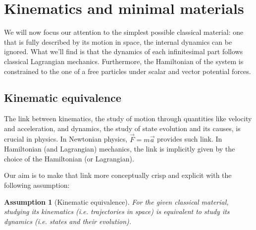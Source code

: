 \documentclass[aps,pra,10pt,twocolumn,floatfix,nofootinbib]{revtex4-1}
\numberwithin{equation}{section}
\newtheorem{assump}{Assumption}
\theoremstyle{definition}
\begin{document}
\section{Kinematics and minimal materials}

We will now focus our attention to the simplest possible classical material: one that is fully described by its motion in space, the internal dynamics can be ignored. What we'll find is that the dynamics of each infinitesimal part follows classical Lagrangian mechanics. Furthermore, the Hamiltonian of the system is constrained to the one of a free particles under scalar and vector potential forces.

\subsection{Kinematic equivalence}

The link between kinematics, the study of motion through quantities like velocity and acceleration, and dynamics, the study of state evolution and its causes, is crucial in physics. In Newtonian physics, $\vec{F}=m\vec{a}$ provides such link. In Hamiltonian (and Lagrangian) mechanics, the link is implicitly given by the choice of the Hamiltonian (or Lagrangian).

Our aim is to make that link more conceptually crisp and explicit with the following assumption:

\begin{assump}[Kinematic equivalence]\label{kinematic_equivalence}
	For the given classical material, studying its kinematics  (i.e. trajectories in space) is equivalent to study its dynamics  (i.e. states and their evolution).
\end{assump}
\end{document}
